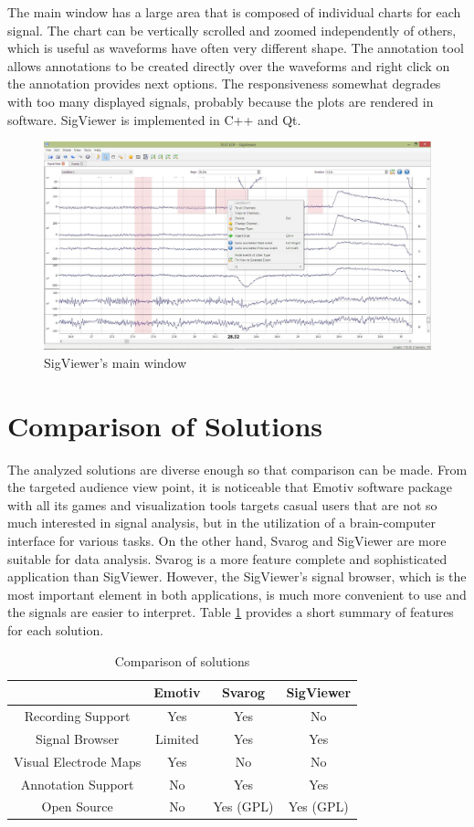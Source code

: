 The main window has a large area that is composed of individual charts for each signal. The chart can be vertically scrolled and zoomed independently of others, which is useful as waveforms have often very different shape. The annotation tool allows annotations to be created directly over the waveforms and right click on the annotation provides next options. The responsiveness somewhat degrades with too many displayed signals, probably because the plots are rendered in software. SigViewer is implemented in C++ and Qt.

\begin{figure}[htb]
	\centering
	\includegraphics[width=0.8\linewidth]{fig/sigviewer.jpg}
	\caption{SigViewer's main window}
	\label{fig:sigviewer}
\end{figure}

\section{Comparison of Solutions}
The analyzed solutions are diverse enough so that comparison can be made. From the targeted audience view point, it is noticeable that Emotiv software package with all its games and visualization tools targets casual users that are not so much interested in signal analysis, but in the utilization of a brain-computer interface for various tasks. On the other hand, Svarog and SigViewer are more suitable for data analysis. Svarog is a more feature complete and sophisticated application than SigViewer. However, the SigViewer's signal browser, which is the most important element in both applications, is much more convenient to use and the signals are easier to interpret. Table \ref{t:comparison} provides a short summary of features for each solution. 

\begin{table}[htbp]
	\centering
	\begin{tabular}{|c|c|c|c|}
		\hline  & Emotiv & Svarog & SigViewer \\ 
		\hline Recording Support & Yes & Yes & No \\ 
		\hline Signal Browser & Limited & Yes & Yes \\ 
		\hline Visual Electrode Maps & Yes & No & No \\ 
		\hline Annotation Support & No & Yes & Yes \\ 
		\hline Open Source & No & Yes (GPL) & Yes (GPL) \\ 
		\hline 
	\end{tabular} 
	\caption{Comparison of solutions}
	\label{t:comparison}
\end{table}

